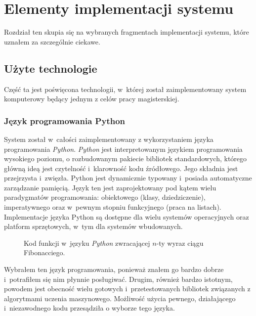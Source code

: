 \documentclass[../thesis.tex]{subfiles}
\begin{document}
\pagestyle{plain}
\chapter{Elementy implementacji systemu}

Rozdział ten skupia się na wybranych fragmentach implementacji systemu, które uznałem za szczególnie ciekawe.

\section{Użyte technologie}

Część ta jest poświęcona technologii, w~której został zaimplementowany system komputerowy będący jednym z celów pracy magisterskiej.

\subsection{Język programowania Python}

System został w~całości zaimplementowany z wykorzystaniem języka programowania \emph{Python}. \emph{Python} jest interpretowanym językiem programowania wysokiego poziomu, o rozbudowanym pakiecie bibliotek standardowych, którego główną ideą jest czytelność i~klarowność kodu źródłowego. Jego składnia jest przejrzysta i~zwięzła. Python jest dynamicznie typowany i~posiada automatyczne zarządzanie pamięcią. Język ten jest zaprojektowany pod kątem wielu paradygmatów programowania: obiektowego (klasy, dziedziczenie), imperatywnego oraz w~pewnym stopniu funkcyjnego (praca na listach). Implementacje języka Python są dostępne dla wielu systemów operacyjnych oraz platform sprzętowych, w~tym dla systemów wbudowanych.

\begin{figure}[h]
\centering
{}

\caption{Kod funkcji w~języku \emph{Python} zwracającej $n$-ty wyraz ciągu Fibonacciego.}
\label{impl:snippet_python}
\end{figure}

Wybrałem ten język programowania, ponieważ znałem go bardzo dobrze i~potrafiłem się nim płynnie posługiwać. Drugim, również bardzo istotnym, powodem jest obecność wielu gotowych i~przetestowanych bibliotek związanych z algorytmami uczenia maszynowego. Możliwość użycia pewnego, działającego i~niezawodnego kodu przesądziła o wyborze tego języka.
\end{document}

